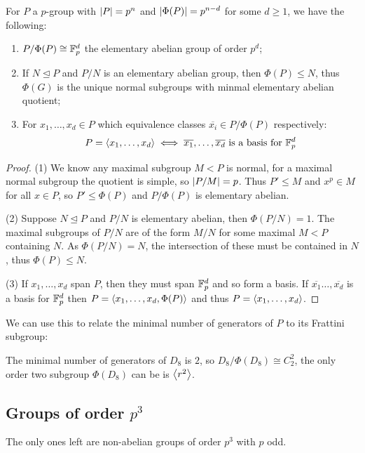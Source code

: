 \documentclass{article}
\begin{document}
\begin{theorem}
    For $P$ a $p$-group with $\left| P \right|=p^n$ and $\left| \Phi(P) \right| = p^{n-d}$ for some $d\geq 1$, we have the following: \begin{enumerate}
        \item $P/\Phi(P)\cong \mathbb{F}_p^d$ the elementary abelian group of order $p^d$;
        \item If $N\unlhd P$ and $P/N$ is an elementary abelian group, then $\Phi(P)\leq N$, thus $\Phi(G)$ is the unique normal subgroups with minmal elementary abelian quotient;
        \item For $x_1,\ldots,x_d\in P$ which equivalence classes $\overline{x_i}\in P/\Phi(P)$ respectively: \[
            P = \left\langle x_1,\ldots,x_d \right\rangle \iff \overline{x_1}, \ldots, \overline{x_d} \text{ is a basis for $\mathbb{F}_p^d$}
        \]
    \end{enumerate}
    \begin{proof}
        (1) We know any maximal subgroup $M<P$ is normal, for a maximal normal subgroup the quotient is simple, so $\left| P/M \right|=p$. Thus $P'\leq M$ and $x^p\in M$ for all $x\in P$, so $P'\leq\Phi(P)$ and $P/\Phi(P)$ is elementary abelian.

        (2) Suppose $N\unlhd P$ and $P/N$ is elementary abelian, then $\Phi(P/N)=1$. The maximal subgroups of $P/N$ are of the form $M/N$ for some maximal $M<P$ containing $N$. As $\Phi(P/N)=N$, the intersection of these must be contained in $N$, thus $\Phi(P)\leq N$.

        (3) If $x_1,\ldots, x_d$ span $P$, then they must span $\mathbb{F}_p^d$ and so form a basis. If $\overline{x_1}\ldots,\overline{x_d}$ is a basis for $\mathbb{F}_p^d$ then $P=\left\langle x_1,\ldots,x_d,\Phi(P) \right\rangle$ and thus $P = \left\langle x_1,\ldots,x_d \right\rangle$.
    \end{proof}
\end{theorem}

We can use this to relate the minimal number of generators of $P$ to its Frattini subgroup:

The minimal number of generators of $D_8$ is $2$, so $D_8/\Phi(D_8)\cong C_2^2$, the only order two subgroup $\Phi(D_8)$ can be is $\left\langle r^2 \right\rangle$.

\subsection{Groups of order $p^3$}

The only ones left are non-abelian groups of order $p^3$ with $p$ odd.
\end{document}
